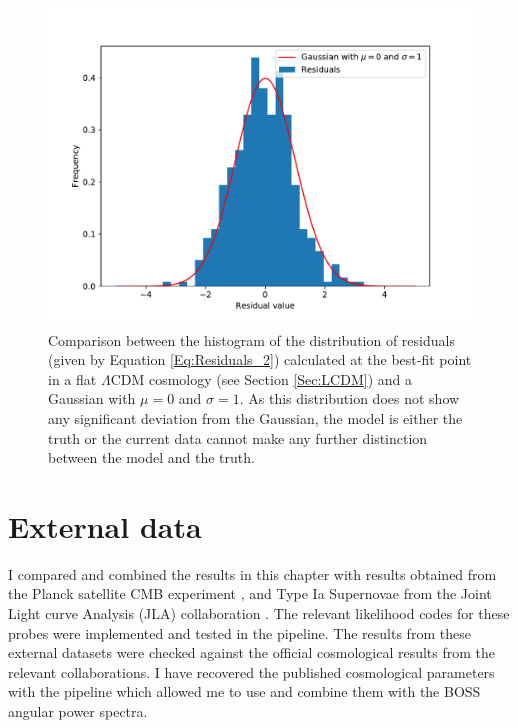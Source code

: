 \begin{figure}
\begin{center}
\includegraphics[scale=0.60]{BOSS-FIGS/chi_lcdm_new.pdf}
\caption[Distribution of residuals for the best-fit point in a flat $\Lambda$CDM models.]{Comparison between the histogram of the distribution of residuals (given by Equation \eqref{Eq:Residuals_2}) calculated at the best-fit point in a flat $\Lambda$CDM cosmology (see Section \ref{Sec:LCDM}) and a Gaussian with $\mu=0$ and $\sigma=1$. As this distribution does not show any significant deviation from the Gaussian, the model is either the truth or the current data cannot make any further distinction between the model and the truth.} 
\label{fig:Residuals}
\end{center}
\end{figure}

\section{External data}\label{Sec:ExternalData}

I compared and combined the results in this chapter with results obtained from the Planck satellite CMB experiment \citep{PlanckResults2015}, and Type Ia Supernovae from the Joint Light curve Analysis (JLA) collaboration \citep{JLAdata}. The relevant likelihood codes for these probes were implemented and tested in the \uclcl pipeline. The results from these external datasets were checked against the official cosmological results from the relevant collaborations. I have recovered the published cosmological parameters with the \uclcl pipeline which allowed me to use and combine them with the BOSS angular power spectra.

